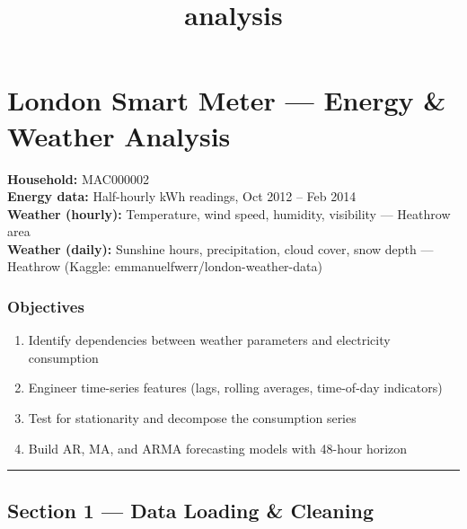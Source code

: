 \documentclass[11pt]{article}
\title{analysis}
\providecommand{\tightlist}{%
      \setlength{\itemsep}{0pt}\setlength{\parskip}{0pt}}
\begin{document}
    
    \maketitle
    
    

    
    \section{London Smart Meter --- Energy \& Weather
Analysis}\label{london-smart-meter-energy-weather-analysis}

\textbf{Household:} MAC000002\\
\textbf{Energy data:} Half-hourly kWh readings, Oct 2012 -- Feb 2014\\
\textbf{Weather (hourly):} Temperature, wind speed, humidity, visibility
--- Heathrow area\\
\textbf{Weather (daily):} Sunshine hours, precipitation, cloud cover,
snow depth --- Heathrow (Kaggle: emmanuelfwerr/london-weather-data)

\subsubsection{Objectives}\label{objectives}

\begin{enumerate}
\def\labelenumi{\arabic{enumi}.}
\tightlist
\item
  Identify dependencies between weather parameters and electricity
  consumption
\item
  Engineer time-series features (lags, rolling averages, time-of-day
  indicators)
\item
  Test for stationarity and decompose the consumption series
\item
  Build AR, MA, and ARMA forecasting models with 48-hour horizon
\end{enumerate}

\begin{center}\rule{0.5\linewidth}{0.5pt}\end{center}

    \subsection{Section 1 --- Data Loading \&
Cleaning}\label{section-1-data-loading-cleaning}
\end{document}
